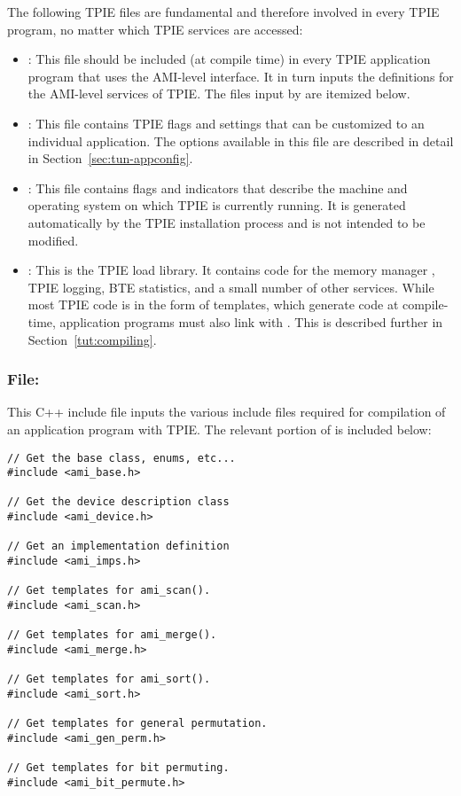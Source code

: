 The following TPIE files are fundamental and therefore
involved in every TPIE program, no matter which TPIE
services are accessed:

\begin{itemize}
    \item {}: This file should be included
    (at compile time) in every TPIE application program that
    uses the AMI-level interface. It in turn inputs the
    definitions for the AMI-level services of TPIE. The
    files input by  are itemized below.

    \item {}: This file contains TPIE
    flags and settings that can be customized to an
    individual application. The options available in this
    file are described in detail in
    Section~\ref{sec:tun-appconfig}.

    \item {}: This file contains flags and
    indicators that describe the machine and operating
    system on which TPIE is currently running. It is
    generated automatically by the TPIE installation
    process and is not intended to be modified.
    
    \item {}: This is the TPIE load
    library. It contains code for the memory manager
    , TPIE logging, BTE statistics, and a
    small number of other services. While most TPIE code is
    in the form of templates, which generate code at
    compile-time, application programs must also link with
    . This is described further in
    Section~\ref{tut:compiling}.
\end{itemize} 

\subsubsection{File: } This C++ include
file inputs the various include files required for
compilation of an application program with TPIE. The relevant portion
of  is included below:

\begin{verbatim}
// Get the base class, enums, etc...
#include <ami_base.h>

// Get the device description class
#include <ami_device.h>

// Get an implementation definition
#include <ami_imps.h>

// Get templates for ami_scan().
#include <ami_scan.h>

// Get templates for ami_merge().
#include <ami_merge.h>

// Get templates for ami_sort().
#include <ami_sort.h>

// Get templates for general permutation.
#include <ami_gen_perm.h>

// Get templates for bit permuting.
#include <ami_bit_permute.h>
\end{verbatim} 

